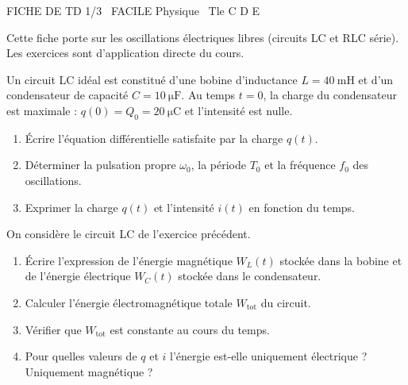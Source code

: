 \documentclass[11pt]{article}
\begin{document}
\begin{tcolorbox}[enhanced,colback=popink,colframe=popink,arc=10pt,boxrule=0pt,left=12pt,right=12pt,top=9pt,bottom=9pt]
{\color{white}\popxbold\small FICHE DE TD 1/3 \textbullet\ FACILE \hfill Physique \textbullet\ Tle C D E\par}
\end{tcolorbox}
\vspace{4pt}

Cette fiche porte sur les oscillations électriques libres (circuits LC et RLC série). Les exercices sont d'application directe du cours.

\begin{exercice}
Un circuit LC idéal est constitué d'une bobine d'inductance $L = \SI{40}{\milli\henry}$ et d'un condensateur de capacité $C = \SI{10}{\micro\farad}$. Au temps $t=0$, la charge du condensateur est maximale : $q(0) = Q_0 = \SI{20}{\micro\coulomb}$ et l'intensité est nulle.
\begin{enumerate}
    \item Écrire l'équation différentielle satisfaite par la charge $q(t)$.
    \item Déterminer la pulsation propre $\omega_0$, la période $T_0$ et la fréquence $f_0$ des oscillations.
    \item Exprimer la charge $q(t)$ et l'intensité $i(t)$ en fonction du temps.
\end{enumerate}
\end{exercice}

\begin{exercice}
On considère le circuit LC de l'exercice précédent.
\begin{enumerate}
    \item Écrire l'expression de l'énergie magnétique $W_L(t)$ stockée dans la bobine et de l'énergie électrique $W_C(t)$ stockée dans le condensateur.
    \item Calculer l'énergie électromagnétique totale $W_{\text{tot}}$ du circuit.
    \item Vérifier que $W_{\text{tot}}$ est constante au cours du temps.
    \item Pour quelles valeurs de $q$ et $i$ l'énergie est-elle uniquement électrique ? Uniquement magnétique ?
\end{enumerate}
\end{exercice}
\end{document}
